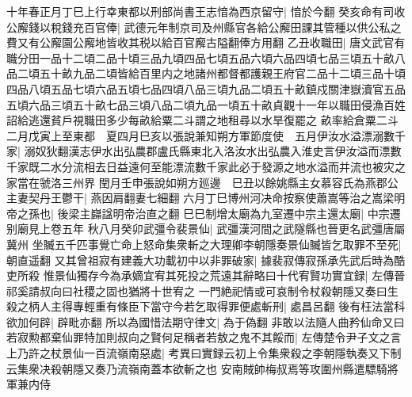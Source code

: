 十年春正月丁巳上行幸東都以刑部尚書王志愔為西京留守|{
	愔於今翻}
癸亥命有司收公廨錢以稅錢充百官俸|{
	武德元年制京司及州縣官各給公廨田課其管種以供公私之費又有公廨園公廨地皆收其税以給百官廨古隘翻俸方用翻}
乙丑收職田|{
	唐文武官有職分田一品十二頃二品十頃三品九頃四品七頃五品六頃六品四頃七品三頃五十畝八品二頃五十畝九品二頃皆給百里内之地諸州都督都護親王府官二品十二頃三品十頃四品八頃五品七頃六品五頃七品四頃八品三頃九品二頃五十畝鎮戍關津嶽瀆官五品五頃六品三頃五十畝七品三頃八品二頃九品一頃五十畝貞觀十一年以職田侵漁百姓詔給逃還貧戶視職田多少每畝給粟二斗謂之地租尋以水旱復罷之}
畝率給倉粟二斗　二月戊寅上至東都　夏四月巳亥以張說兼知朔方軍節度使　五月伊汝水溢漂溺數千家|{
	溺奴狄翻漢志伊水出弘農郡盧氏縣東北入洛汝水出弘農入淮史言伊汝溢而漂數千家既二水分流相去日益遠何至能漂流數千家此必于發源之地水溢而并流也被灾之家當在虢洛三州界}
閏月壬申張說如朔方廵邊　巳丑以餘姚縣主女慕容氏為燕郡公主妻契丹王鬱干|{
	燕因肩翻妻七細翻}
六月丁巳博州河决命按察使蕭嵩等治之嵩梁明帝之孫也|{
	後梁主巋諡明帝治直之翻}
巳巳制增太廟為九室遷中宗主還太廟|{
	中宗遷别廟見上卷五年}
秋八月癸卯武彊令裴景仙|{
	武彊漢河間之武隧縣也晉更名武彊唐屬冀州}
坐贓五千匹事覺亡命上怒命集衆斬之大理卿李朝隱奏景仙贓皆乞取罪不至死|{
	朝直遥翻}
又其曾祖寂有建義大功載初中以非罪破家|{
	據裴寂傳寂孫承先武后時為酷吏所殺}
惟景仙獨存今為承嫡宜宥其死投之荒遠其辭略曰十代宥賢功實宜録|{
	左傳晉祁奚請叔向曰社稷之固也猶將十世宥之}
一門絶祀情或可哀制令杖殺朝隱又奏曰生殺之柄人主得專輕重有條臣下當守今若乞取得罪便處斬刑|{
	處昌呂翻}
後有枉法當科欲加何辟|{
	辟毗亦翻}
所以為國惜法期守律文|{
	為于偽翻}
非敢以法隨人曲矜仙命又曰若寂勲都棄仙罪特加則叔向之賢何足稱者若敖之鬼不其餒而|{
	左傳楚令尹子文之言}
上乃許之杖景仙一百流嶺南惡處|{
	考異曰實録云初上令集衆殺之李朝隱執奏又下制云集衆决殺朝隱又奏乃流嶺南蓋本欲斬之也}
安南賊帥梅叔焉等攻圍州縣遣驃騎將軍兼内侍

